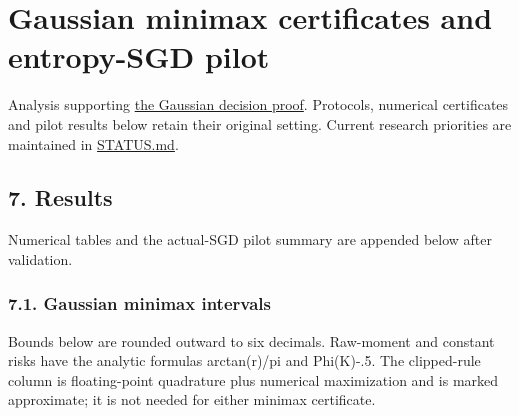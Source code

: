 \section{Gaussian minimax certificates and entropy-SGD
pilot}\label{gaussian_results-gaussian-minimax-certificates-and-entropy-sgd-pilot}

Analysis supporting \href{../../../paper/gaussian_decision.md}{the
Gaussian decision proof}. Protocols, numerical certificates and pilot
results below retain their original setting. Current research priorities
are maintained in \href{../../../STATUS.md}{STATUS.md}.

\subsection{7. Results}\label{gaussian_results-results}

Numerical tables and the actual-SGD pilot summary are appended below
after validation.

\subsubsection{7.1. Gaussian minimax
intervals}\label{gaussian_results-gaussian-minimax-intervals}

Bounds below are rounded outward to six decimals. Raw-moment and
constant risks have the analytic formulas arctan(r)/pi and Phi(K)-.5.
The clipped-rule column is floating-point quadrature plus numerical
maximization and is marked approximate; it is not needed for either
minimax certificate.

